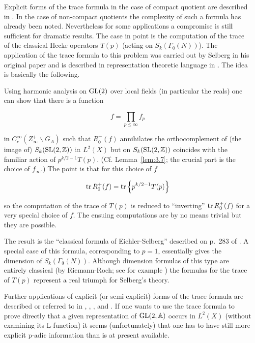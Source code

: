 \begin{sloppypar}

Explicit forms of the trace formula in the case of compact quotient are described in \cite{GelfandGraevPyatetskiiShapiro}. In the case of non-compact quotients the complexity of such a formula has already been noted. Nevertheless for some applications a compromise is still sufficient for dramatic results. The case in point is the computation of the trace of the classical Hecke operators $T(p)$ (acting on $S_k(\Gamma_0(N))$). The application of the trace formula to this problem was carried out by Selberg in his original paper and is described in representation theoretic language in \cite{DufloLabesse}. The idea is basically the following.

\end{sloppypar}

Using harmonic analysis on $\operatorname{GL}(2)$ over local fields (in particular the reals) one can show that there is a function

\[
f = \prod_{p \leq \infty} f_p
\]

in $C_c^\infty(Z_\infty^{+} \backslash G_A)$ such that $R_0^{+}(f)$ annihilates the orthocomplement of (the image of) $S_k(\operatorname{SL}(2,\mathbb{Z}))$ in $L^2(X)$ but on $S_k(\operatorname{SL}(2,\mathbb{Z}))$ coincides with the familiar action of $p^{k/2 - 1}T(p)$. (Cf. Lemma~\ref{lem:3.7}; the crucial part is the choice of $f_\infty$.) The point is that for this choice of $f$

\[
\operatorname{tr} R_0^{+}(f) = \operatorname{tr}\left\{p^{k/2 - 1}T(p)\right\}
\]

so the computation of the trace of $T(p)$ is reduced to ``inverting'' $\operatorname{tr} R_0^{+}(f)$ for a very special choice of $f$. The ensuing computations are by no means trivial but they are possible.

The result is the ``classical formula of Eichler-Selberg'' described on p.~283 of \cite{DufloLabesse}. A special case of this formula, corresponding to $p = 1$, essentially gives the dimension of $S_k(\Gamma_0(N))$. Although dimension formulas of this type are entirely classical (by Riemann-Roch; see for example \cite{Shimura}) the formulas for the trace of $T(p)$ represent a real triumph for Selberg's theory.

Further applications of explicit (or semi-explicit) forms of the trace formula are described or referred to in \cite{GelfandGraevPyatetskiiShapiro}, \cite{DufloLabesse}, \cite{Labesse}, and \cite{JacquetLanglands}. If one wants to use the trace formula to prove directly that a given representation of $\operatorname{GL}(2, \mathbb{A})$ occurs in $L^2(X)$ (without examining its L-function) it seems (unfortunately) that one has to have still more explicit p-adic information than is at present available.
